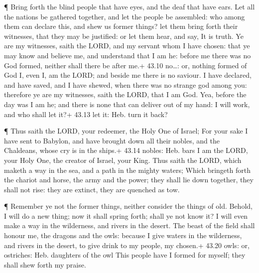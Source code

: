  ¶ Bring forth the blind people that have eyes, and the deaf
that have ears.  Let all the nations be gathered together,
and let the people be assembled: who among them can declare this, and
shew us former things? let them bring forth their witnesses, that they
may be justified: or let them hear, and say, It is truth. 
Ye are my witnesses, saith the LORD, and my servant whom I have chosen:
that ye may know and believe me, and understand that I am he: before me
there was no God formed, neither shall there be after me.+ 43.10
no\ldots: or, nothing formed of God  I, even I, am the
LORD; and beside me there is no saviour.  I have declared,
and have saved, and I have shewed, when there was no strange god among
you: therefore ye are my witnesses, saith the LORD, that I am God.
 Yea, before the day was I am he; and there is none that
can deliver out of my hand: I will work, and who shall let it?+ 43.13
let it: Heb. turn it back?

 ¶ Thus saith the LORD, your redeemer, the Holy One of
Israel; For your sake I have sent to Babylon, and have brought down all
their nobles, and the Chaldeans, whose cry is in the ships.+ 43.14
nobles: Heb. bars  I am the LORD, your Holy One, the
creator of Israel, your King.  Thus saith the LORD, which
maketh a way in the sea, and a path in the mighty waters; 
Which bringeth forth the chariot and horse, the army and the power; they
shall lie down together, they shall not rise: they are extinct, they are
quenched as tow.

 ¶ Remember ye not the former things, neither consider the
things of old.  Behold, I will do a new thing; now it shall
spring forth; shall ye not know it? I will even make a way in the
wilderness, and rivers in the desert.  The beast of the
field shall honour me, the dragons and the owls: because I give waters
in the wilderness, and rivers in the desert, to give drink to my people,
my chosen.+ 43.20 owls: or, ostriches: Heb. daughters of the owl
 This people have I formed for myself; they shall shew
forth my praise.

